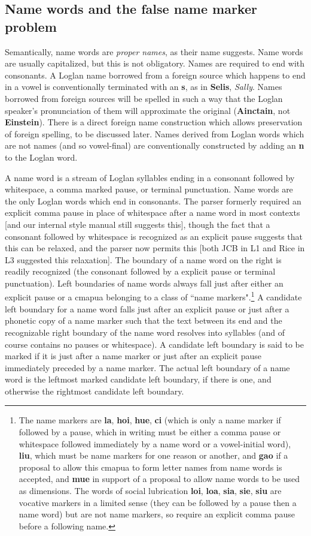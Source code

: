 \documentclass[12pt]{book}
\begin{document}
\subsection{Name words and the false name marker problem}

Semantically, name words are {\em proper names\/}, as their name suggests.  Name words are usually capitalized, but this is not obligatory.  Names are required to end with consonants.  A Loglan name borrowed from a foreign source which happens to end in a vowel is conventionally terminated with an {\bf s},
as in {\bf Selis}, {\em Sally\/}.  Names borrowed from foreign sources will be spelled in such a way that the Loglan speaker's pronunciation of them will approximate the original ({\bf Ainctain}, not {\bf Einstein}).  There is a direct foreign name construction which allows preservation of foreign spelling, to be discussed later.  Names derived from Loglan words which are not names (and so vowel-final) are conventionally constructed by adding an {\bf n} to
the Loglan word.

A name word is a stream of Loglan syllables ending in a consonant followed by whitespace, a comma marked pause, or terminal punctuation.  Name words are the only Loglan words which end in consonants.  The parser formerly required an explicit comma pause in place of whitespace after a name word in most contexts [and our internal style manual still suggests this], though the fact that a consonant followed by whitespace is recognized as an explicit pause suggests that this can be relaxed, and the parser now permits this [both JCB in L1 and Rice in L3 suggested this relaxation].  The boundary of a name word on the right is readily recognized (the consonant followed by a explicit pause or terminal punctuation).  Left boundaries of name words always fall just after either an explicit pause or a cmapua belonging to a class of ``name markers".\footnote{The name markers are {\bf la}, {\bf hoi}, {\bf hue}, {\bf ci} (which is only a name marker if followed by a pause, which in writing must be either a comma pause or whitespace followed immediately by a name word or a vowel-initial word), {\bf liu}, which must be name markers for one reason or another, and {\bf gao} if a proposal to allow this cmapua to form letter names from name words is accepted, and {\bf mue} in support of a proposal to allow name words to be used as dimensions.  The words of social lubrication {\bf loi}, {\bf loa}, {\bf sia}, {\bf sie}, {\bf siu} are vocative markers in a limited sense (they can be followed by a pause then a name word) but are not name markers, so require an explicit comma pause before a following name.}   A candidate left boundary for a name word falls just after an explicit pause or just after a phonetic copy of a name marker such that the text between its end and the recognizable right boundary of the name word resolves into syllables (and of course contains no pauses or whitespace).   A candidate left boundary is said to be marked if it is just after a name marker  or just after an explicit pause immediately preceded by a name marker.  The actual left boundary of a name word is the leftmost marked candidate left boundary, if there is one, and otherwise the rightmost candidate left boundary.
\end{document}
